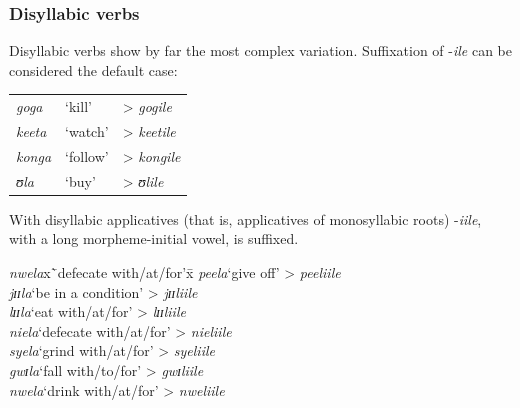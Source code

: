 \subsubsection{Disyllabic verbs} \label{ImbricationDisyllabic}
Disyllabic verbs show by far the most complex variation. Suffixation of -\textit{ile}
can be considered the default case:
\begin{exe}
\ex
\begin{tabular}[t]{@{}>{\itshape}lll}
\textit{goga}&`kill'& > \textit{gogile}\\
\textit{keeta}&`watch'& > \textit{keetile}\\
\textit{konga}&`follow'& > \textit{kongile}\\
\textit{ʊla}&`buy'& > \textit{ʊlile}
\end{tabular}
\end{exe}


With disyllabic applicatives (that is, applicatives of monosyllabic roots) -\textit{iile}, with a long morpheme-initial vowel, is suffixed.
\begin{exe}
\ex
\begin{tabbing}
\textit{nwela}x\=`defecate with/at/for'x\=\kill%
\textit{peela}\>`give off'\> > \textit{peeliile}\\
\textit{jɪɪla}\>`be in a condition'\> > \textit{jɪɪliile}\\
\textit{lɪɪla}\>`eat with/at/for'\> > \textit{lɪɪliile}\\
\textit{niela}\>`defecate with/at/for'\> > \textit{nieliile}\\
\textit{syela}\>`grind with/at/for'\> > \textit{syeliile}\\
\textit{gwɪla}\>`fall with/to/for'\> > \textit{gwɪliile}\\
\textit{nwela}\>`drink with/at/for'\> > \textit{nweliile}
\end{tabbing}
\end{exe}

